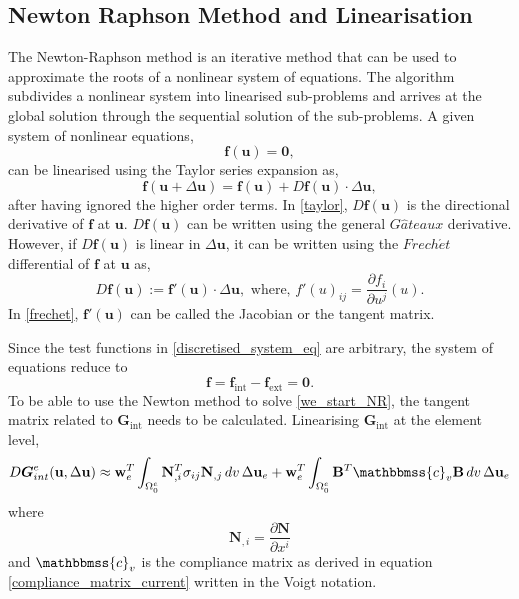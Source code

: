 \documentclass[../main.tex]{subfiles}
\begin{document}
\subsection{Newton Raphson Method and Linearisation}
The Newton-Raphson method is an iterative method that can be used to approximate the roots of a nonlinear system of equations. 
 The algorithm subdivides a nonlinear system into linearised sub-problems and arrives at the global solution through the sequential
 solution of the sub-problems.
A given system of nonlinear equations, 
\begin{equation}
    \boldsymbol{f}(\boldsymbol{u}) = \boldsymbol{0},
\end{equation}
can be linearised using the Taylor series expansion as,
\begin{equation} \label{taylor}
    \boldsymbol{f}(\boldsymbol{u}+ \Delta \boldsymbol{u}) = \boldsymbol{f}(\boldsymbol{u}) + D \boldsymbol{f}(\boldsymbol{u}) \cdot \Delta \boldsymbol{u},
\end{equation}
after having ignored the higher order terms. In \eqref{taylor}, $D \boldsymbol{f}(\boldsymbol{u})$ is the directional derivative of
 $\boldsymbol{f}$ at $\boldsymbol{u}$. 
$D \boldsymbol{f}(\boldsymbol{u})$ can be written using the general $G\hat{a}teaux$ derivative. However, if $D \boldsymbol{f}(\boldsymbol{u})$ is linear
 in $\Delta \boldsymbol{u}$, it can be written using the $Frech\acute{e}t$ differential of $\boldsymbol{f}$ at $\boldsymbol{u}$ as,
 \begin{equation} \label{frechet}
    D \boldsymbol{f}(\boldsymbol{u}) := \boldsymbol{f} \prime \left(\boldsymbol{u}\right) \cdot \Delta \boldsymbol{u}, \text{ where, } f'(u)_{ij} = \frac{\partial f_{i}}{\partial u^{j}} (u).
 \end{equation}
In \eqref{frechet}, $\boldsymbol{f} \prime \left(\boldsymbol{u}\right)$ can be called the Jacobian or the tangent matrix. 

Since the test functions in \eqref{discretised_system_eq} are arbitrary, the system of equations reduce to 
\begin{equation} \label{we_start_NR}
    \mathbf{f} = \mathbf{f}_{\text{int}} - \mathbf{f}_{\text{ext}} = \boldsymbol{0}.
\end{equation}
To be able to use the Newton method to solve \eqref{we_start_NR}, the tangent matrix related to $\boldsymbol{G}_{\text{int}}$ needs to be calculated.
 Linearising $\boldsymbol{G}_{\text{int}}$ at the element level,
\begin{equation} \label{lin_Gint}
    D \boldsymbol{G}^{e}_{int} (\mathbf{u}, \Delta \mathbf{u}) \approx \mathbf{w}^{T}_{e} \int_{\Omega^{e}_{0}} \mathbf{N}^{T}_{,i} \sigma_{ij} \mathbf{N}_{,j} \,dv \,\Delta \mathbf{u}_{e}
        + \mathbf{w}^{T}_{e} \int_{\Omega^{e}_{0}} \mathbf{B}^{T} \mathbbmss{c}_{v} \mathbf{B} \,dv \,\Delta \mathbf{u}_{e}
\end{equation}
where 
\begin{equation}
    \mathbf{N}_{,i} = \frac{\partial \mathbf{N}}{\partial x^{i}}
\end{equation}
and $\mathbbmss{c}_{v}$ is the compliance matrix as derived in equation \eqref{compliance_matrix_current} written in the Voigt notation.
\end{document}
